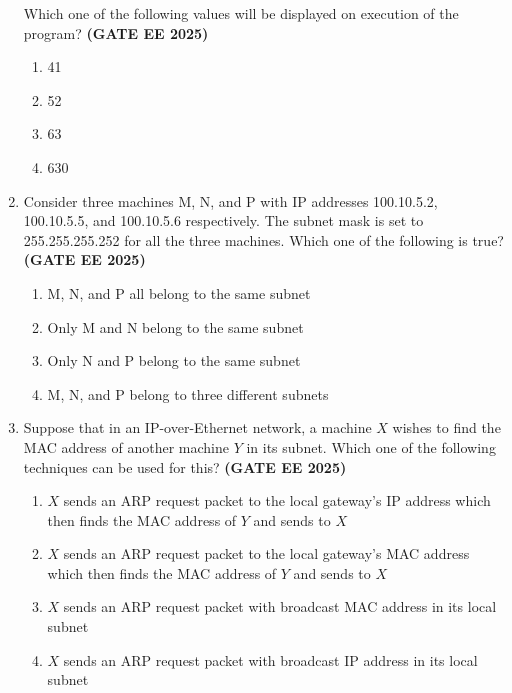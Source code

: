 \documentclass[journal,12pt,onecolumn]{IEEEtran}
\theoremstyle{remark}
\begin{document}
\begin{enumerate}
Which one of the following values will be displayed on execution of the program?
\hfill \textbf{(GATE EE 2025)}
\begin{enumerate}
\item  41
\item  52
\item  63
\item  630
\end{enumerate}



\item Consider three machines M, N, and P with IP addresses 
100.10.5.2, 100.10.5.5, and 100.10.5.6 respectively.  
The subnet mask is set to 255.255.255.252 for all the three machines.  
Which one of the following is true?\hfill \textbf{(GATE EE 2025)}

\begin{enumerate}
\item  M, N, and P all belong to the same subnet
\item  Only M and N belong to the same subnet
\item  Only N and P belong to the same subnet
\item  M, N, and P belong to three different subnets
\end{enumerate}


\item  Suppose that in an IP-over-Ethernet network, a machine $X$ wishes to find the MAC address of another machine $Y$ in its subnet. Which one of the following techniques can be used for this?  \hfill \textbf{(GATE EE 2025)}

\begin{enumerate}
  \item   $X$ sends an ARP request packet to the local gateway's IP address which then finds the MAC address of $Y$ and sends to $X$
  \item   $X$ sends an ARP request packet to the local gateway's MAC address which then finds the MAC address of $Y$ and sends to $X$
  \item   $X$ sends an ARP request packet with broadcast MAC address in its local subnet
  \item   $X$ sends an ARP request packet with broadcast IP address in its local subnet
\end{enumerate}



\end{enumerate}
\end{document}
